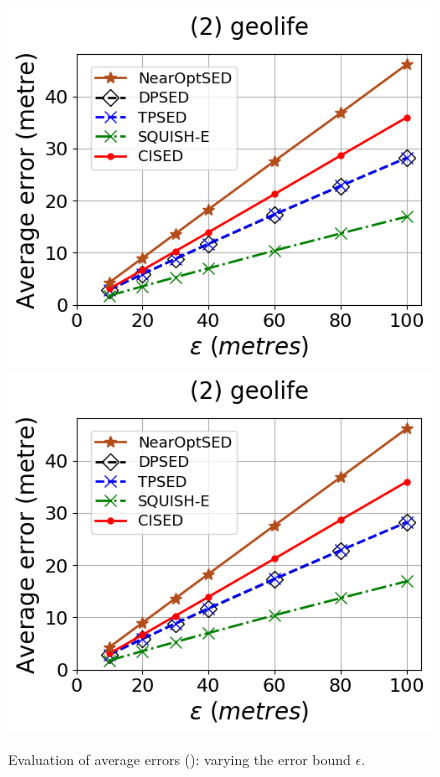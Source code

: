 \begin{figure}[tb!]
	\includegraphics[scale=0.315]{Figures/Exp-error-epsilon-geolife.png}	\hspace{1ex}
	\includegraphics[scale=0.315]{Figures/Exp-error-epsilon-geolife.png}
	\vspace{-2ex}
	\caption{\small Evaluation of average errors (\ped): varying the error bound $\epsilon$.}
	\label{fig:ae-ped}
	\vspace{-.5ex}
\end{figure}

